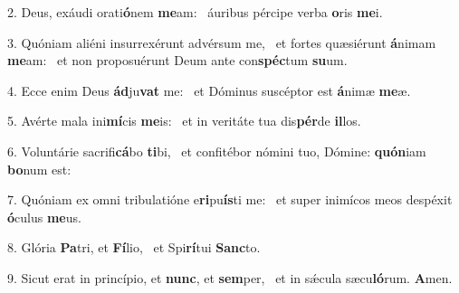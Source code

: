 2. Deus, exáudi orati\textbf{ó}nem \textbf{me}am: \ast\  áuribus pércipe verba \textbf{o}ris \textbf{me}i.\

3. Quóniam aliéni insurrexérunt advérsum me, \dag\  et fortes quæsiérunt \textbf{á}nimam \textbf{me}am: \ast\  et non proposuérunt Deum ante con\textbf{spéc}tum \textbf{su}um.\

4. Ecce enim Deus \textbf{ád}ju\textbf{vat} me: \ast\  et Dóminus suscéptor est \textbf{á}nimæ \textbf{me}æ.\

5. Avérte mala ini\textbf{mí}cis \textbf{me}is: \ast\  et in veritáte tua dis\textbf{pér}de \textbf{il}los.\

6. Voluntárie sacrifi\textbf{cá}bo \textbf{ti}bi, \ast\  et confitébor nómini tuo, Dómine: \textbf{quón}iam \textbf{bo}num est:\

7. Quóniam ex omni tribulatióne e\textbf{ri}pu\textbf{ís}ti me: \ast\  et super inimícos meos despéxit \textbf{ó}culus \textbf{me}us.\

8. Glória \textbf{Pa}tri, et \textbf{Fí}lio, \ast\  et Spi\textbf{rí}tui \textbf{Sanc}to.\

9. Sicut erat in princípio, et \textbf{nunc}, et \textbf{sem}per, \ast\  et in sǽcula sæcu\textbf{ló}rum. \textbf{A}men.\

